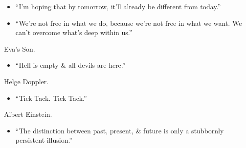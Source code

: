 \documentclass{article}
\begin{document}
\begin{enumerate}
\begin{itemize}
		\item ``I'm hoping that by tomorrow, it'll already be different from today.''
		\item ``We're not free in what we do, because we're not free in what we want. We can't overcome what's deep within us.''
	\end{itemize}
	{\sc Eva's Son.}
	\begin{itemize}
		\item ``Hell is empty \& all devils are here.''
	\end{itemize}
	{\sc Helge Doppler.}
	\begin{itemize}
		\item ``Tick Tack. Tick Tack.''
	\end{itemize}
	{\sc Albert Einstein.}
	\begin{itemize}
		\item ``The distinction between past, present, \& future is only a stubbornly persistent illusion.''
	\end{itemize}
	

\end{enumerate}
\end{document}
